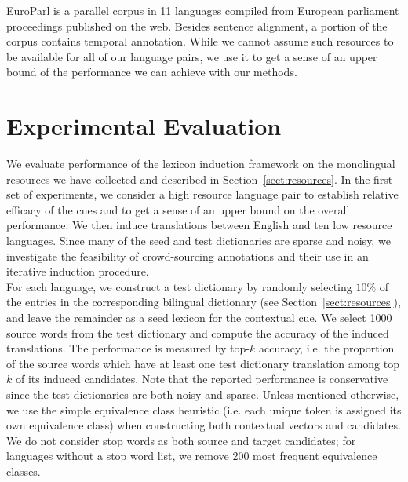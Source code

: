 \documentclass{article}
\newcommand{\mnote}[1]{\marginpar{%
  \vskip-\baselineskip
  \raggedright\footnotesize
  \itshape\hrule\smallskip\tiny{#1}\par\smallskip\hrule}}
\newcommand{\mtodo}[1]{\mnote{\textcolor{red}{#1}}}
\newcommand{\secref}[1]{Section~\ref{#1}}
\begin{document}
\mtodo{Note: Ben's runs used an older crawl from April.}

  EuroParl \cite{Koehn:2005} is a parallel corpus in 11 languages compiled from European parliament proceedings published on the web.  Besides sentence alignment, a portion of the corpus contains temporal annotation.  While we cannot assume such resources to be available for all of our language pairs, we use it to get a sense of an upper bound of the performance we can achieve with our methods.

\section{Experimental Evaluation} \label{sect:experiments}

We evaluate performance of the lexicon induction framework on the monolingual resources we have collected and described in \secref{sect:resources}.  In the first set of experiments, we consider a high resource language pair to establish relative efficacy of the cues and to get a sense of an upper bound on the overall performance. We then induce translations between English and ten low resource languages.  Since many of the seed and test dictionaries are sparse and noisy, we investigate the feasibility of crowd-sourcing annotations and their use in an iterative induction procedure. \\ %

For each language, we construct a test dictionary by randomly selecting $10\%$ of the entries in the corresponding bilingual dictionary (see \secref{sect:resources}), and leave the remainder as a seed lexicon for the contextual cue.  We select 1000 source words from the test dictionary and compute the accuracy of the induced translations.  The performance is measured by top-$k$ accuracy, i.e. the proportion of the source words which have at least one test dictionary translation among top $k$ of its induced candidates.  Note that the reported performance is conservative since the test dictionaries are both noisy and sparse. Unless mentioned otherwise, we use the simple equivalence class heuristic (i.e. each unique token is assigned its own equivalence class) when constructing both contextual vectors and candidates.  We do not consider stop words as both source and target candidates; for languages without a stop word list, we remove 200 most frequent equivalence classes.\\
\end{document}
